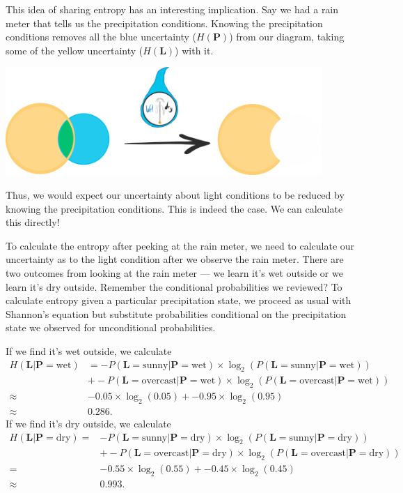 This idea of sharing entropy has an interesting implication.
Say we had a rain meter that tells us the precipitation conditions.
Knowing the precipitation conditions removes all the blue uncertainty ($H(\bm{P})$) from our diagram, taking some of the yellow uncertainty ($H(\bm{L})$) with it.
\begin{center}
  \includegraphics[trim= 0 0 0 0, clip, width=0.9\textwidth]{img/rain-meter-peek}
\end{center}
Thus, we would expect our uncertainty about light conditions to be reduced by knowing the precipitation conditions.
This is indeed the case.
We can calculate this directly!

To calculate the entropy after peeking at the rain meter, we need to calculate our uncertainty as to the light condition after we observe the rain meter.
There are two outcomes from looking at the rain meter --- we learn it's wet outside or we learn it's dry outside.
Remember the conditional probabilities we reviewed?
To calculate entropy given a particular precipitation state, we proceed as usual with Shannon's equation but substitute probabilities conditional on the precipitation state we observed for unconditional probabilities.

If we find it's wet outside, we calculate
\begin{align*}
H(\bm{L} | \bm{P} = \text{wet})
&=
- P(\bm{L} = \text{sunny} | \bm{P} = \text{wet}) \times \log_2(P(\bm{L} = \text{sunny} | \bm{P} = \text{wet})) \\
&+ - P(\bm{L} = \text{overcast} | \bm{P} = \text{wet}) \times \log_2(P(\bm{L} = \text{overcast} | \bm{P} = \text{wet})) \\
\approx&
- 0.05 \times \log_2(0.05) + - 0.95 \times \log_2(0.95) \\
\approx& 0.286.
\end{align*}
If we find it's dry outside, we calculate
\begin{align*}
H(\bm{L} | \bm{P} = \text{dry})
=&
- P(\bm{L} = \text{sunny} | \bm{P} = \text{dry}) \times \log_2(P(\bm{L} = \text{sunny} | \bm{P} = \text{dry})) \\
&+  - P(\bm{L} = \text{overcast} | \bm{P} = \text{dry}) \times \log_2(P(\bm{L} = \text{overcast} | \bm{P} = \text{dry})) \\
=&
- 0.55 \times \log_2(0.55) + - 0.45 \times \log_2(0.45) \\
\approx& 0.993.
\end{align*}

